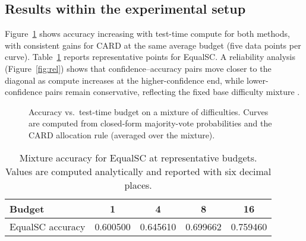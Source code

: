 \documentclass[11pt]{article}
\begin{document}
\subsection{Results within the experimental setup}
Figure~\ref{fig:acc} shows accuracy increasing with test-time compute for both methods, with consistent gains for CARD at the same average budget (five data points per curve).
Table~\ref{tab:summary} reports representative points for EqualSC.
A reliability analysis (Figure~\ref{fig:rel}) shows that confidence--accuracy pairs move closer to the diagonal as compute increases at the higher-confidence end, while lower-confidence pairs remain conservative, reflecting the fixed base difficulty mixture \citep{Wang2023SelfConsistency,Lightman2023LetsVerify}.

\begin{figure}[h]
\centering
{}
\caption{Accuracy vs.\ test-time budget on a mixture of difficulties. Curves are computed from closed-form majority-vote probabilities and the CARD allocation rule (averaged over the mixture).}
\label{fig:acc}
\end{figure}

\begin{table}[h]
\centering
\caption{Mixture accuracy for EqualSC at representative budgets. Values are computed analytically and reported with six decimal places.}
\label{tab:summary}
\begin{adjustbox}{width=\linewidth}
\begin{tabular}{lcccc}
\toprule
Budget & 1 & 4 & 8 & 16 \\
\midrule
EqualSC accuracy & 0.600500 & 0.645610 & 0.699662 & 0.759460 \\
\bottomrule
\end{tabular}
\end{adjustbox}
\end{table}
\end{document}
